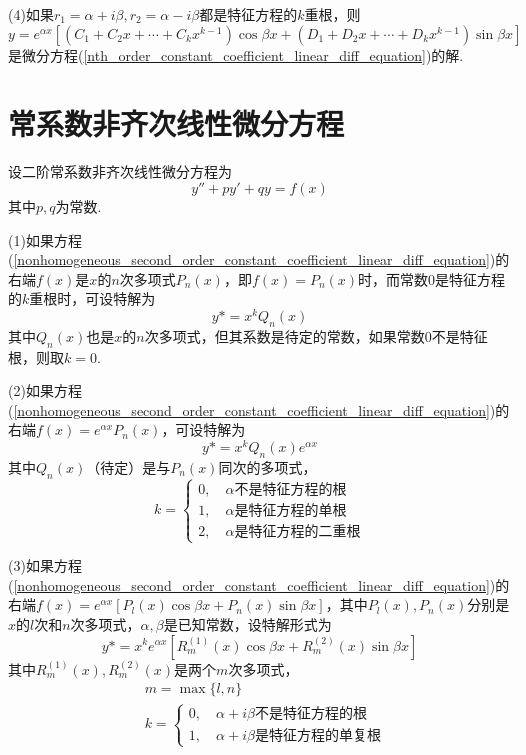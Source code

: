 (4)如果$r_1=\alpha+i\beta,r_2=\alpha-i\beta$都是特征方程的$k$重根，则
\begin{equation*}
    y=e^{\alpha x}[(C_1+C_2x+\cdots+C_kx^{k-1})\cos\beta x+(D_1+D_2x+\cdots+D_kx^{k-1})\sin\beta x]
\end{equation*}
是微分方程(\ref{nth_order_constant_coefficient_linear_diff_equation})的解.

\section{常系数非齐次线性微分方程}
设二阶常系数非齐次线性微分方程为
\begin{equation}
    y''+py'+qy=f(x) \label{nonhomogeneous_second_order_constant_coefficient_linear_diff_equation}
\end{equation}
其中$p,q$为常数.

(1)如果方程(\ref{nonhomogeneous_second_order_constant_coefficient_linear_diff_equation})的右端$f(x)$是$x$的$n$次多项式$P_n(x)$，即$f(x)=P_n(x)$时，而常数0是特征方程的$k$重根时，可设特解为
\begin{equation*}
    y*=x^kQ_n(x)
\end{equation*}
其中$Q_n(x)$也是$x$的$n$次多项式，但其系数是待定的常数，如果常数0不是特征根，则取$k=0$.

(2)如果方程(\ref{nonhomogeneous_second_order_constant_coefficient_linear_diff_equation})的右端$f(x)=e^{\alpha x}P_n(x)$，可设特解为
\begin{equation*}
    y*=x^kQ_n(x)e^{\alpha x}
\end{equation*}
其中$Q_n(x)$（待定）是与$P_n(x)$同次的多项式，
\begin{equation*}
    k=
    \begin{cases}
        0, \quad \alpha\mbox{不是特征方程的根} \\
        1, \quad \alpha\mbox{是特征方程的单根} \\
        2, \quad \alpha\mbox{是特征方程的二重根}
    \end{cases}
\end{equation*}

(3)如果方程(\ref{nonhomogeneous_second_order_constant_coefficient_linear_diff_equation})的右端$f(x)=e^{\alpha x}[P_l(x)\cos\beta x+P_n(x)\sin\beta x]$，其中$P_l(x),P_n(x)$分别是$x$的$l$次和$n$次多项式，$\alpha,\beta$是已知常数，设特解形式为
\begin{equation*}
    y*=x^ke^{\alpha x}[R_m^{(1)}(x)\cos\beta x+R_m^{(2)}(x)\sin\beta x]
\end{equation*}
其中$R_m^{(1)}(x),R_m^{(2)}(x)$是两个$m$次多项式，
\begin{align*}
    & m=\max\{l,n\} \\
    & k=
    \begin{cases}
        0, \quad \alpha+i\beta\mbox{不是特征方程的根} \\
        1, \quad \alpha+i\beta\mbox{是特征方程的单复根}
    \end{cases}
\end{align*}